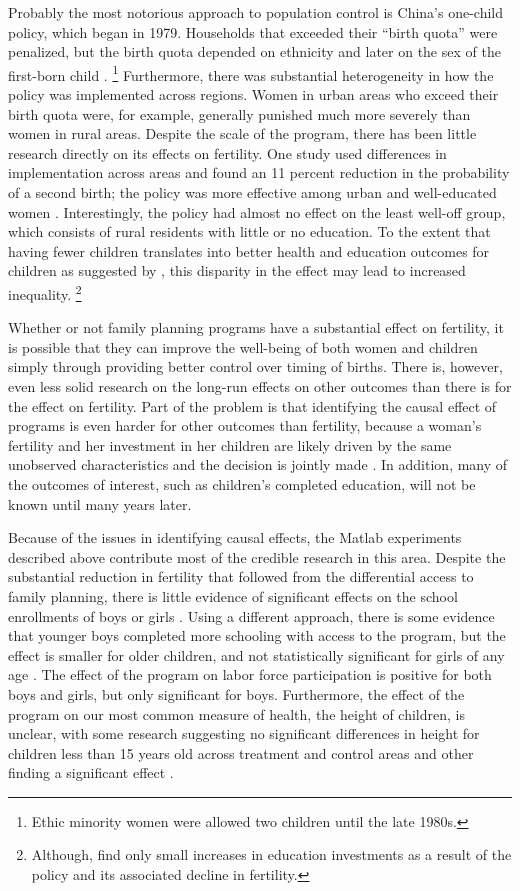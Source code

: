 \documentclass[letterpaper,12pt]{article}
\begin{document}
Probably the most notorious approach to population control is China's
one-child policy, which began in 1979.
Households that exceeded their ``birth quota'' were penalized, but the
birth quota depended on ethnicity and later on the sex of the first-born
child \citep{Li2005}.%
\footnote{
Ethic minority women were allowed two children until the late 1980s.}
Furthermore, there was substantial heterogeneity in how the policy was
implemented across regions.
Women in urban areas who exceed their birth quota were, for example,
generally punished much more severely than women in rural areas.
Despite the scale of the program, there has been little research
directly on its effects on fertility.
One study used differences in implementation across areas and found an
11 percent reduction in the probability of a second birth; the policy
was more effective among urban and well-educated women \citep{Li2005}.
Interestingly, the policy had almost no eﬀect on the least well-oﬀ
group, which consists of rural residents with little or no education.
To the extent that having fewer children translates into better health
and education outcomes for children as suggested by \citet{becker73},
this disparity in the effect may lead to increased inequality.%
\footnote{
Although, \citet{Rosenzweig2009} find only small increases in education
investments as a result of the policy and its associated decline in
fertility.}

Whether or not family planning programs have a substantial effect on
fertility, it is possible that they can improve the well-being of both
women and children simply through providing better control over timing
of births.
There is, however, even less solid research on the long-run effects on
other outcomes than there is for the effect on fertility.
Part of the problem is that identifying the causal effect of programs is
even harder for other outcomes than fertility, because a woman's
fertility and her investment in her children are likely driven by the
same unobserved characteristics and the decision is jointly made
\citep{Schultz2005}.
In addition, many of the outcomes of interest, such as children's
completed education, will not be known until many years later.

Because of the issues in identifying causal effects, the Matlab
experiments described above contribute most of the credible research in
this area.
Despite the substantial reduction in fertility that followed from the
differential access to family planning, there is little evidence of
significant effects on the school enrollments of boys or girls
\citep{Sinha2005}.
Using a different approach, there is some evidence that younger boys
completed more schooling with access to the program, but the effect is
smaller for older children, and not statistically significant for girls
of any age \citep{Joshi2007}.
The effect of the program on labor force participation is positive for
both boys and girls, but only signiﬁcant for boys.
Furthermore, the effect of the program on our most common measure of
health, the height of children, is unclear, with some research
suggesting no significant differences in height for children less than
15 years old across treatment and control areas \citep{Joshi2007} and
other finding a significant effect \citep{Barham2012}.
\end{document}

